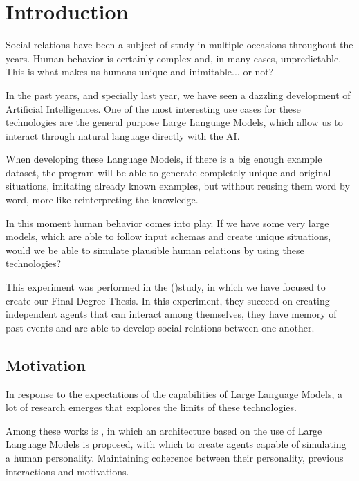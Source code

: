 \chapter*{Introduction}
\label{cap:introduction}


Social relations have been a subject of study in multiple occasions throughout the years. Human behavior is certainly complex and, in many cases, unpredictable. This is what makes us humans unique and inimitable... or not?

In the past years, and specially last year, we have seen a dazzling development of Artificial Intelligences. One of the most interesting use cases for these technologies are the general purpose Large Language Models, which allow us to interact through natural language directly with the AI.

When developing these Language Models, if there is a big enough example dataset, the program will be able to generate completely unique and original situations, imitating already known examples, but without reusing them word by word, more like reinterpreting the knowledge.

In this moment human behavior comes into play. If we have some very large models, which are able to follow input schemas and create unique situations, would we be able to simulate plausible human relations by using these technologies?

This experiment was performed in the \ga (\cite{park2023generative})study, in which we have focused to create our Final Degree Thesis. In this experiment, they succeed on creating independent agents that can interact among themselves, they have memory of past events and are able to develop social relations between one another.

\section{Motivation}
In response to the expectations of the capabilities of Large Language Models, a lot of research emerges that explores the limits of these technologies.

Among these works is \ga, in which an architecture based on the use of Large Language Models is proposed, with which to create agents capable of simulating a human personality. Maintaining coherence between their personality, previous interactions and motivations.

